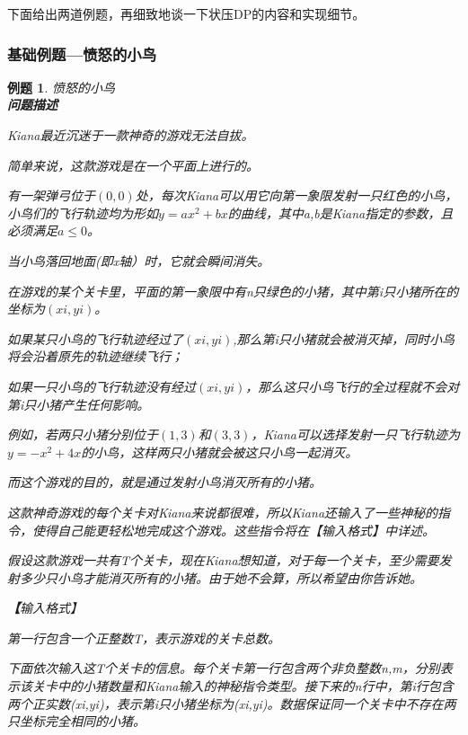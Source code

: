 \documentclass{article}
\newtheorem{example}{例题}[subsection]
\theoremstyle{nonumberplain}
\begin{document}
下面给出两道例题，再细致地谈一下状压DP的内容和实现细节。

\iftrue%
\subsubsection{基础例题---愤怒的小鸟}
\begin{example}愤怒的小鸟\\
\textbf{问题描述}

Kiana最近沉迷于一款神奇的游戏无法自拔。

简单来说，这款游戏是在一个平面上进行的。

有一架弹弓位于$(0,0)$处，每次Kiana可以用它向第一象限发射一只红色的小鸟，小鸟们的飞行轨迹均为形如$y=ax^2+bx$的曲线，其中a,b是Kiana指定的参数，且必须满足$a\leq 0$。

当小鸟落回地面(即x轴）时，它就会瞬间消失。

在游戏的某个关卡里，平面的第一象限中有n只绿色的小猪，其中第i只小猪所在的坐标为$(xi,yi)$。

如果某只小鸟的飞行轨迹经过了$(xi,yi)$,那么第i只小猪就会被消灭掉，同时小鸟将会沿着原先的轨迹继续飞行；

如果一只小鸟的飞行轨迹没有经过$(xi,yi)$，那么这只小鸟飞行的全过程就不会对第i只小猪产生任何影响。

例如，若两只小猪分别位于$(1,3)$和$(3,3)$，Kiana可以选择发射一只飞行轨迹为$y=-x^2+4x$的小鸟，这样两只小猪就会被这只小鸟一起消灭。

而这个游戏的目的，就是通过发射小鸟消灭所有的小猪。

这款神奇游戏的每个关卡对Kiana来说都很难，所以Kiana还输入了一些神秘的指令，使得自己能更轻松地完成这个游戏。这些指令将在【输入格式】中详述。

假设这款游戏一共有T个关卡，现在Kiana想知道，对于每一个关卡，至少需要发射多少只小鸟才能消灭所有的小猪。由于她不会算，所以希望由你告诉她。

\textbf【输入格式】

第一行包含一个正整数T，表示游戏的关卡总数。

下面依次输入这T个关卡的信息。每个关卡第一行包含两个非负整数n,m，分别表示该关卡中的小猪数量和Kiana输入的神秘指令类型。接下来的n行中，第i行包含两个正实数(xi,yi)，表示第i只小猪坐标为(xi,yi)。数据保证同一个关卡中不存在两只坐标完全相同的小猪。


\end{example}
\end{document}
